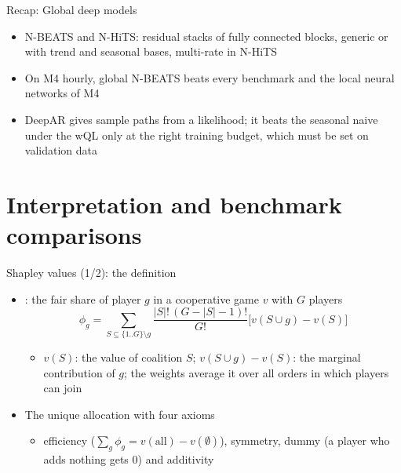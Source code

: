 \begin{frame}{Recap: Global deep models}
\itemsize{\small}
\begin{itemize}
    \item N-BEATS and N-HiTS: residual stacks of fully connected blocks, generic or with trend and seasonal bases, multi-rate in N-HiTS
    \item On M4 hourly, global N-BEATS beats every benchmark and the local neural networks of M4
    \item DeepAR gives sample paths from a likelihood; it beats the seasonal naive under the wQL only at the right training budget, which must be set on validation data
\end{itemize}
\end{frame}


\section{Interpretation and benchmark comparisons}

\begin{frame}{Shapley values (1/2): the definition}
\itemsize{\small}
\begin{itemize}
    \item {}: the fair share of player $g$ in a cooperative game $v$ with $G$ players
    \[ \phi_g = \sum_{S \subseteq \{1..G\}\setminus g}\frac{|S|!\,(G - |S| - 1)!}{G!}\big[v(S\cup g) - v(S)\big] \]
    \begin{itemize}
        \item $v(S)$: the value of coalition $S$; $v(S\cup g) - v(S)$: the marginal contribution of $g$; the weights average it over all orders in which players can join
    \end{itemize}
    \item The unique allocation with four axioms
    \begin{itemize}
        \item efficiency ($\sum_g\phi_g = v(\mathrm{all}) - v(\emptyset)$), symmetry, dummy (a player who adds nothing gets 0) and additivity
    \end{itemize}
\end{itemize}
\end{frame}

